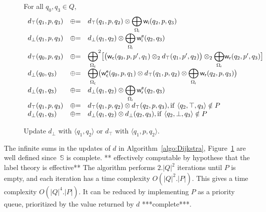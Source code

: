 \documentclass[runningheads]{llncs}
\def\<#1>{\langle #1 \rangle}
\newcommand{\opluseq}{\ensuremath\mathrel{\oplus}=}
\newcommand{\Semiring}{\mathbb{S}}
\def\wei{\mathsf{w}}
\def\Omegai{{\Omega_\mathsf{i}}}
\def\Omegac{{\Omega_\mathsf{c}}}
\def\Omegar{{\Omega_\mathsf{r}}}
\def\Phic{{\Phi_\mathsf{c}}}
\def\weii{{\wei_\mathsf{i}}}
\def\weic{{\wei_\mathsf{c}}}
\def\weir{{\wei_\mathsf{r}}}
\def\weiei{{\wei^\mathsf{e}_\mathsf{i}}}
\def\weiec{{\wei^\mathsf{e}_\mathsf{c}}}
\def\weier{{\wei^\mathsf{e}_\mathsf{r}}}
\begin{document}
\begin{figure}
For all $q_0, q_3 \in Q$, %
\[
\begin{array}{lcl}
d_\top(q_1, p, q_3) & \opluseq &
  d_\top(q_1, p, q_2) \otimes 
  \displaystyle\bigoplus_{\Omegai} \weii(q_2, p, q_3)\\
%
d_\bot(q_1, p, q_3) & \opluseq &
  d_\bot(q_1, q_2) \otimes 
  \displaystyle\bigoplus_{\Omegai} \weiei(q_2, q_3)\\
%     
d_\top(q_0, p, q_3) & \opluseq &
  {\displaystyle\bigoplus_{\Omegac}}^2 
  \bigl[ \bigl( \weic(q_0, p, p', q_1) \otimes_2 
  d_\top(q_1, p', q_2) \bigr) \otimes_2
  {\displaystyle\bigoplus_{\Omegar}} \weir(q_2, p', q_3) \bigr]\\
%
d_\bot(q_0, q_3) & \opluseq &
  {\displaystyle\bigoplus_{\Omegac}}
  \bigl(
  \weiec(q_0, p, q_1) \otimes 
   d_\top(q_1, p, q_2) \otimes
  \displaystyle\bigoplus_{\Omegar} \weir(q_2, p, q_3)\bigr)\\
%
d_\bot(q_1, q_3) & \opluseq &
  d_\bot(q_1, q_2) \otimes 
  \displaystyle\bigoplus_{\Omegar} \weier(q_2, q_3)\\
%
d_\top(q_1, p, q_3) & \opluseq & 
  d_\top(q_1, p, q_2) \otimes d_\top(q_2, p, q_3), 
  \mathrm{if~} \< q_2, \top, q_3> \notin P \\
%
d_\bot(q_1, q_3) & \opluseq & 
  d_\bot(q_1, q_2) \otimes d_\bot(q_2, q_3), \mathrm{if~} \< q_2, \bot, q_3> \notin P \\
\end{array}
\]
%
\caption{Update $d_\bot$ with $\<q_1, q_2>$ or $d_\top$ with $\< q_1, p, q_2>$.} 
\label{fig:best-update}
\end{figure}


\noindent
The infinite sums in the updates of $d$ in Algorithm~\ref{algo:Dijkstra}, 
Figure~\ref{fig:best-update}
are well defined
since~$\Semiring$ is complete.
** effectively computable by hypothese that the label theory is effective**
The algorithm performs $2.|Q|^2$ iterations until $P$ is empty, 
and each iteration has a time complexity $O(|Q|^2 . |P|)$.
This gives a time complexity $O(|Q|^4 . |P|)$. 
It can be reduced by implementing $P$ as a priority queue, 
prioritized by the value returned by $d$
***complete***. %
\end{document}
